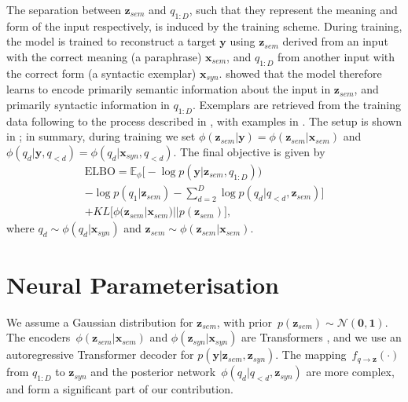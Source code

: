 \documentclass[11pt]{article}
\begin{document}
The separation between $\textbf{z}_{sem}$ and
$q_{1:D}$, such that they represent the meaning and form of the input
respectively, is induced by the
training scheme. During training, the model is trained to reconstruct
a target $\textbf{y}$ using $\textbf{z}_{sem}$ derived from an input with the
correct meaning (a paraphrase) $\textbf{x}_{sem}$, and $q_{1:D}$ from
another input with the correct form (a syntactic exemplar)
$\textbf{x}_{syn}$. \citet{hosking-lapata-2021-factorising} showed that the model therefore learns to encode primarily semantic information about the input in $\textbf{z}_{sem}$, and primarily syntactic information in $q_{1:D}$. Exemplars are retrieved from the training data
following to the process described in 
\citet{hosking-lapata-2021-factorising}, with examples in . The setup is shown in
; in summary, during training we set
$\phi(\textbf{z}_{sem} | \textbf{y}) = \phi(\textbf{z}_{sem} |
\textbf{x}_{sem})$ and $\phi(q_d | \textbf{y}, q_{< d}) = \phi(q_d |
\textbf{x}_{syn}, q_{< d})$. The final objective is given by
\begin{multline} \label{eq:finalobjective}
    \text{ELBO} = \mathbb{E}_{\phi}\big [-\log p(\textbf{y} | \textbf{z}_{sem}, q_{1:D})) \\
     - \log p(q_1 | \textbf{z}_{sem})  - \sum\limits_{d=2}^D \log p(q_d | q_{< d}, \textbf{z}_{sem})  \big ] \\
      + KL\big [\phi(\textbf{z}_{sem} | \textbf{x}_{sem}) || p(\textbf{z}_{sem})\big ],
\end{multline}
where $q_d \sim \phi(q_d|\textbf{x}_{syn})$ and $\textbf{z}_{sem} \sim \phi(\textbf{z}_{sem}|\textbf{x}_{sem} )$.



















\section{Neural Parameterisation}




We assume a Gaussian distribution for $\textbf{z}_{sem}$, with prior~$p(\textbf{z}_{sem}) \sim \mathcal{N}(\textbf{0},
\textbf{1})$. The encoders~$\phi(\textbf{z}_{sem} | \textbf{x}_{sem})$ and $\phi(\textbf{z}_{syn} | \textbf{x}_{syn})$ are Transformers \cite{Vaswani2017}, and we use an autoregressive Transformer decoder for $p(\textbf{y} | \textbf{z}_{sem}, \textbf{z}_{syn})$. The mapping~$f_{q \rightarrow \textbf{z}}(\cdot)$ from $q_{1:D}$ to $\textbf{z}_{syn}$ and the posterior network~$\phi(q_d | q_{< d}, \textbf{z}_{syn} )$ are more complex, and form a significant part of our contribution.
\end{document}

